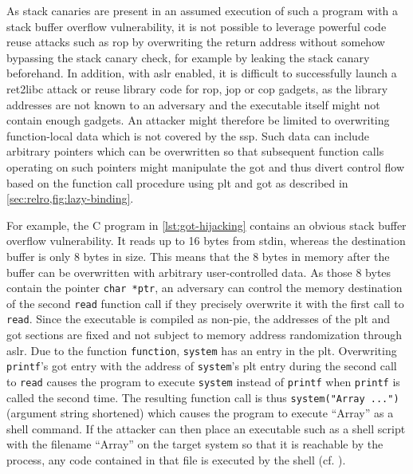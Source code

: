 As stack canaries are present in an assumed execution of such a program with a stack buffer overflow vulnerability, it is not possible to leverage powerful code reuse attacks such as \gls{rop} by overwriting the return address without somehow bypassing the stack canary check, for example by leaking the stack canary beforehand.
In addition, with \gls{aslr} enabled, it is difficult to successfully launch a \gls{ret2libc} attack or reuse library code for \gls{rop}, \gls{jop} or \gls{cop} gadgets, as the library addresses are not known to an adversary and the executable itself might not contain enough gadgets.
An attacker might therefore be limited to overwriting function-local data which is not covered by the \gls{ssp}.
Such data can include arbitrary pointers which can be overwritten so that subsequent function calls operating on such pointers might manipulate the \gls{got} and thus divert control flow based on the function call procedure using \gls{plt} and \gls{got} as described in \cref{sec:relro,fig:lazy-binding}.



For example, the C program in \cref{lst:got-hijacking} contains an obvious stack buffer overflow vulnerability.
It reads up to 16 bytes from \gls{stdin}, whereas the destination buffer is only 8 bytes in size.
This means that the 8 bytes in memory after the buffer can be overwritten with arbitrary user-controlled data.
As those 8 bytes contain the pointer \texttt{char *ptr}, an adversary can control the memory destination of the second \texttt{read} function call if they precisely overwrite it with the first call to \texttt{read}.
Since the executable is compiled as non-\acs{pie}, the addresses of the \gls{plt} and \gls{got} sections are fixed and not subject to memory address randomization through \gls{aslr}.
Due to the function \texttt{function}, \texttt{system} has an entry in the \gls{plt}.
Overwriting \texttt{printf}'s \gls{got} entry with the address of \texttt{system}'s \gls{plt} entry during the second call to \texttt{read} causes the program to execute \texttt{system} instead of \texttt{printf} when \texttt{printf} is called the second time.
The resulting function call is thus \texttt{system("Array ...")} (argument string shortened) which causes the program to execute ``Array'' as a shell command.
If the attacker can then place an executable such as a shell script with the filename ``Array'' on the target system so that it is reachable by the process, any code contained in that file is executed by the shell (cf. \cite[15\psq]{Mueller2008}).

